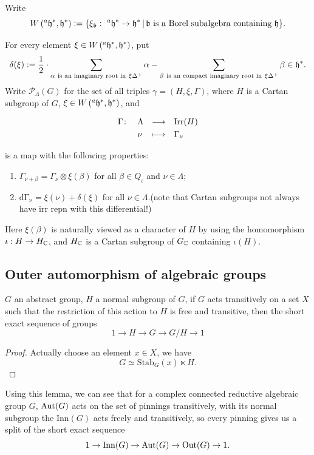 \documentclass[12pt]{amsart}
\numberwithin{equation}{section}
\newcommand{\Inn}{{\mathrm{Inn}}} \newcommand{\Out}{{\mathrm{Out}}}
\newcommand{\bra}[1]{\left(#1\right)}
\newcommand{\set}[2]{\{#1\,|\,#2\}}
\newcommand{\shortexact}[5]{#1\rightarrow #2 \rightarrow #3 \rightarrow #4\rightarrow #5}
\newcommand{\defmap}[5]{
    \begin{equation*}
        \begin{aligned}
            #1 \colon \quad  & #2 &\longrightarrow &\quad #3 \\
            \quad  & #4    &\longmapsto  &\quad #5
        \end{aligned}
    \end{equation*}
}
\begin{document}
Write $$W\bra{^{a}\fh^*,\fh^*} :=  \set{\xi_{\fb}: \ ^{a}\fh^* \to \fh^*}{\fb \ \textrm{is a Borel subalgebra containing} \ \fh}.$$

\begin{defn}
  For every element $\xi \in W\bra{^{a}\fh^*,\fh^*}$, put
  $$\delta(\xi) := \frac{1}{2} \cdot \sum\limits_{\alpha  \ \textrm{is an imaginary root in} \ \xi\Delta^+}\alpha - \sum\limits_{\beta \ \textrm{is an compact imaginary root in} \ \xi\Delta^+}\beta \in \fh^* .$$
  Write $\mathcal{P} _{\Lambda}(G)$ for the set of all triples $\gamma = (H,\xi,\Gamma)$, where
  $H$ is a Cartan subgroup of $G$, $\xi \in W\bra{^{a}\fh^*,\fh^*}$, and
  \defmap{\Gamma}{\Lambda}{\Irr(H)}{\nu}{\Gamma_{\nu}}
  is a map with the following properties:
  \begin{enumerate}
    \item $\Gamma_{\nu+\beta} = \Gamma_{\nu} \otimes \xi(\beta)$ for all $\beta \in Q_{\iota}$ and $\nu \in \Lambda$;
    \item $\mathrm{d\Gamma_{\nu}} = \xi(\nu) + \delta(\xi)$ for all $\nu \in \Lambda$.\textcolor{Mahogany}{(note that Cartan subgroups not always have irr repn with this differential!)}
  \end{enumerate}
  Here $\xi(\beta)$ is naturally viewed as a character of $H$ by using the homomorphism
  $\iota : H \to H_{{\mathbb {C}}}$, and $H_{{\mathbb {C}}}$ is a Cartan subgroup of $G_{{\mathbb {C}}}$ containing $\iota(H)$.
\end{defn}



\subsection{Outer automorphism of algebraic groups}

\begin{lem}
  $G$ an abstract group, $H$ a normal subgroup of $G$, if $G$ acts
  transitively on a set $X$ such that the restriction of this action
  to $H$ is free and transitive, then the short exact sequence of groups
  $$\shortexact{1}{H}{G}{G/H}{1}$$
\end{lem}

\begin{proof}
  Actually choose an element $x \in X$, we have
  $$ G \simeq \mathrm{Stab}_{G}(x) \ltimes H.$$
\end{proof}


Using this lemma, we can see that for a complex connected reductive
algebraic group $G$, ${\mathrm{Aut}}(G)$ acts on the set of pinnings transitively,
with its normal subgroup the $\Inn(G)$ acts freely and transitively,
so every pinning gives us a split of the short exact sequence
$$\shortexact{1}{\Inn(G)}{\Aut(G)}{\Out(G)}{1}.$$
\end{document}
